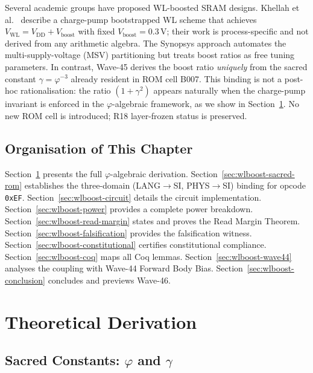 Several academic groups have proposed WL-boosted SRAM designs.
Khellah et al.\ \cite{ti_sloa240} describe a charge-pump bootstrapped
WL scheme that achieves $V_{\mathrm{WL}} = V_{\mathrm{DD}} + V_{\mathrm{boost}}$
with fixed $V_{\mathrm{boost}} = 0.3\,\text{V}$; their work is
process-specific and not derived from any arithmetic algebra.
The Synopsys approach \cite{synopsys_lpdm} automates the
multi-supply-voltage (MSV) partitioning but treats boost ratios as
free tuning parameters.  In contrast, Wave-45 derives the boost ratio
\emph{uniquely} from the sacred constant $\gamma = \varphi^{-3}$
already resident in ROM cell B007.  This binding is not a
post-hoc rationalisation: the ratio $(1+\gamma^{2})$ appears
naturally when the charge-pump invariant is enforced in the
$\varphi$-algebraic framework, as we show in
Section~\ref{sec:wlboost-theory}.  No new ROM cell is introduced; R18
layer-frozen status is preserved.

\subsection{Organisation of This Chapter}

Section~\ref{sec:wlboost-theory} presents the full $\varphi$-algebraic
derivation.  Section~\ref{sec:wlboost-sacred-rom} establishes the
three-domain (LANG$\to$SI, PHYS$\to$SI) binding for opcode
\texttt{0xEF}.  Section~\ref{sec:wlboost-circuit} details the circuit
implementation.  Section~\ref{sec:wlboost-power} provides a complete
power breakdown.  Section~\ref{sec:wlboost-read-margin} states and
proves the Read Margin Theorem.  Section~\ref{sec:wlboost-falsification}
provides the falsification witness.
Section~\ref{sec:wlboost-constitutional} certifies constitutional
compliance.  Section~\ref{sec:wlboost-coq} maps all Coq lemmas.
Section~\ref{sec:wlboost-wave44} analyses the coupling with Wave-44
Forward Body Bias.  Section~\ref{sec:wlboost-conclusion} concludes and
previews Wave-46.

\section{Theoretical Derivation}
\label{sec:wlboost-theory}

\subsection{Sacred Constants: \texorpdfstring{$\varphi$}{phi} and \texorpdfstring{$\gamma$}{gamma}}

